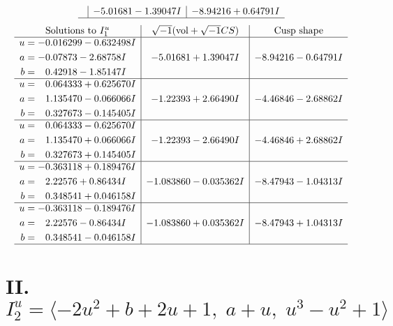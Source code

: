 \documentclass[1p]{elsarticle_modified}
\theoremstyle{definition}
\newcommand{\I}{\sqrt{-1}}
\begin{document}
$$\begin{array}{c|c|c}
 & -5.01681 - 1.39047 I & -8.94216 + 0.64791 I\\
 \hline 
 \end{array}$$\newpage$$\begin{array}{c|c|c}  
\text{Solutions to }I^u_{1}& \I (\text{vol} + \sqrt{-1}CS) & \text{Cusp shape}\\
 \hline 
\begin{aligned}
u &= -0.016299 - 0.632498 I \\
a &= -0.07873 - 2.68758 I \\
b &= \phantom{-}0.42918 - 1.85147 I\end{aligned}
 & -5.01681 + 1.39047 I & -8.94216 - 0.64791 I \\ \hline\begin{aligned}
u &= \phantom{-}0.064333 + 0.625670 I \\
a &= \phantom{-}1.135470 - 0.066066 I \\
b &= \phantom{-}0.327673 - 0.145405 I\end{aligned}
 & -1.22393 + 2.66490 I & -4.46846 - 2.68862 I \\ \hline\begin{aligned}
u &= \phantom{-}0.064333 - 0.625670 I \\
a &= \phantom{-}1.135470 + 0.066066 I \\
b &= \phantom{-}0.327673 + 0.145405 I\end{aligned}
 & -1.22393 - 2.66490 I & -4.46846 + 2.68862 I \\ \hline\begin{aligned}
u &= -0.363118 + 0.189476 I \\
a &= \phantom{-}2.22576 + 0.86434 I \\
b &= \phantom{-}0.348541 + 0.046158 I\end{aligned}
 & -1.083860 - 0.035362 I & -8.47943 - 1.04313 I \\ \hline\begin{aligned}
u &= -0.363118 - 0.189476 I \\
a &= \phantom{-}2.22576 - 0.86434 I \\
b &= \phantom{-}0.348541 - 0.046158 I\end{aligned}
 & -1.083860 + 0.035362 I & -8.47943 + 1.04313 I\\
 \hline 
 \end{array}$$\newpage\newpage\renewcommand{\arraystretch}{1}
\centering \section*{II. $I^u_{2}= \langle -2 u^2+b+2 u+1,\;a+u,\;u^3- u^2+1 \rangle$}
\end{document}
